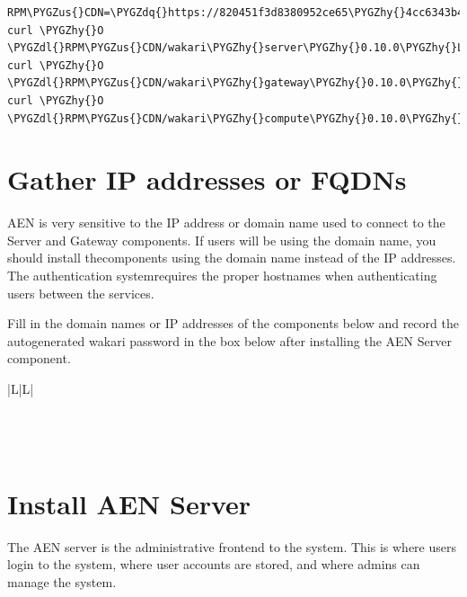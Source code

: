 \documentclass[letterpaper,10pt,openany,oneside]{sphinxmanual}
\def\PYGZus{\char`\_}
\def\PYGZdl{\char`\$}
\def\PYGZhy{\char`\-}
\def\PYGZdq{\char`\"}
\begin{document}
\begin{Verbatim}[commandchars=\\\{\}]
RPM\PYGZus{}CDN=\PYGZdq{}https://820451f3d8380952ce65\PYGZhy{}4cc6343b423784e82fd202bb87cf87cf.ssl.cf1.rackcdn.com\PYGZdq{}
curl \PYGZhy{}O \PYGZdl{}RPM\PYGZus{}CDN/wakari\PYGZhy{}server\PYGZhy{}0.10.0\PYGZhy{}Linux\PYGZhy{}x86\PYGZus{}64.sh
curl \PYGZhy{}O \PYGZdl{}RPM\PYGZus{}CDN/wakari\PYGZhy{}gateway\PYGZhy{}0.10.0\PYGZhy{}Linux\PYGZhy{}x86\PYGZus{}64.sh
curl \PYGZhy{}O \PYGZdl{}RPM\PYGZus{}CDN/wakari\PYGZhy{}compute\PYGZhy{}0.10.0\PYGZhy{}Linux\PYGZhy{}x86\PYGZus{}64.sh
\end{Verbatim}


\section{Gather IP addresses or FQDNs}
\label{AnacondaEnterpriseNotebooks:gather-ip-addresses-or-fqdns}
AEN is very sensitive to the IP address or domain name used to
connect to the Server and Gateway components. If users will be using the
domain name, you should install thecomponents using the domain name
instead of the IP addresses. The authentication systemrequires the
proper hostnames when authenticating users between the services.

Fill in the domain names or IP addresses of the components below and
record the auto­generated wakari password in the box below after
installing the AEN Server component.

\begin{tabulary}{\linewidth}{|L|L|}
\hline
 \\
\hline {}\\
\hline {}\\
\hline {}\\
\hline\end{tabulary}



\section{Install AEN Server}
\label{AnacondaEnterpriseNotebooks:install-aen-server}
The AEN server is the administrative front­end to the system. This is
where users login to the system, where user accounts are stored, and
where admins can manage the system.
\end{document}
